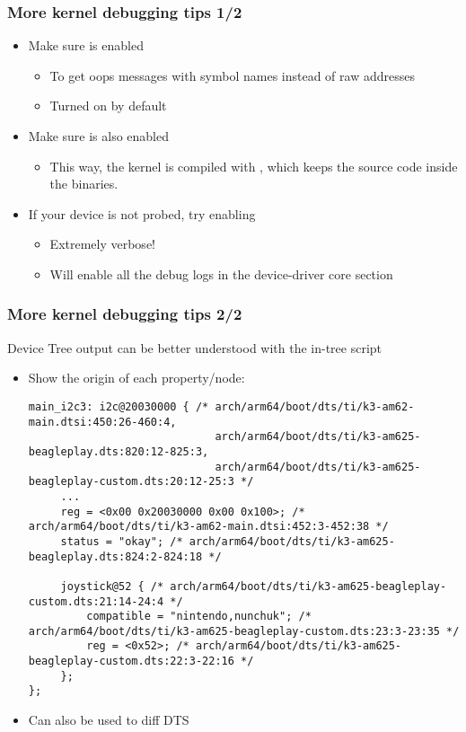 \begin{frame}
  \frametitle{More kernel debugging tips 1/2}
  \begin{itemize}
  \item Make sure  is enabled
    \begin{itemize}
    \item To get oops messages with symbol names instead of raw
      addresses
    \item Turned on by default
    \end{itemize}
  \item Make sure  is also enabled
    \begin{itemize}
    \item This way, the kernel is compiled with , which keeps the source code inside the binaries.
    \end{itemize}
  \item If your device is not probed, try enabling
    \begin{itemize}
    \item Extremely verbose!
    \item Will enable all the debug logs in the device-driver core
      section
    \end{itemize}
  \end{itemize}
\end{frame}

\begin{frame}[fragile]
  \frametitle{More kernel debugging tips 2/2}
  Device Tree output can be better understood with the in-tree  script
  \begin{itemize}
  \item Show the origin of each property/node: 
    \begin{verbatim}
main_i2c3: i2c@20030000 { /* arch/arm64/boot/dts/ti/k3-am62-main.dtsi:450:26-460:4,
                             arch/arm64/boot/dts/ti/k3-am625-beagleplay.dts:820:12-825:3,
                             arch/arm64/boot/dts/ti/k3-am625-beagleplay-custom.dts:20:12-25:3 */
     ...
     reg = <0x00 0x20030000 0x00 0x100>; /* arch/arm64/boot/dts/ti/k3-am62-main.dtsi:452:3-452:38 */
     status = "okay"; /* arch/arm64/boot/dts/ti/k3-am625-beagleplay.dts:824:2-824:18 */

     joystick@52 { /* arch/arm64/boot/dts/ti/k3-am625-beagleplay-custom.dts:21:14-24:4 */
         compatible = "nintendo,nunchuk"; /* arch/arm64/boot/dts/ti/k3-am625-beagleplay-custom.dts:23:3-23:35 */
         reg = <0x52>; /* arch/arm64/boot/dts/ti/k3-am625-beagleplay-custom.dts:22:3-22:16 */
     };
};
    \end{verbatim}
  \item Can also be used to diff DTS
  \end{itemize}
\end{frame}

